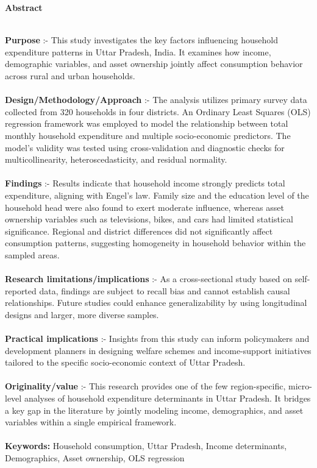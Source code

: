 

\begin{center}
\large \bf{Abstract}
\end{center}
\\
\textbf{Purpose} :- This study investigates the key factors influencing household expenditure patterns in Uttar Pradesh, India. It examines how income, demographic variables, and asset ownership jointly affect consumption behavior across rural and urban households.
\\
\\
\textbf{Design/Methodology/Approach} :- The analysis utilizes primary survey data collected from 320 households in four districts. An Ordinary Least Squares (OLS) regression framework was employed to model the relationship between total monthly household expenditure and multiple socio-economic predictors. The model’s validity was tested using cross-validation and diagnostic checks for multicollinearity, heteroscedasticity, and residual normality.
\\
\\
\textbf{Findings} :- Results indicate that household income strongly predicts total expenditure, aligning with Engel’s law. Family size and the education level of the household head were also found to exert moderate influence, whereas asset ownership variables such as televisions, bikes, and cars had limited statistical significance. Regional and district differences did not significantly affect consumption patterns, suggesting homogeneity in household behavior within the sampled areas.
\\
\\
\textbf{Research limitations/implications } :- As a cross-sectional study based on self-reported data, findings are subject to recall bias and cannot establish causal relationships. Future studies could enhance generalizability by using longitudinal designs and larger, more diverse samples.
\\
\\
\textbf{Practical implications} :- Insights from this study can inform policymakers and development planners in designing welfare schemes and income-support initiatives tailored to the specific socio-economic context of Uttar Pradesh.
\\
\\
\textbf{Originality/value} :- This research provides one of the few region-specific, micro-level analyses of household expenditure determinants in Uttar Pradesh. It bridges a key gap in the literature by jointly modeling income, demographics, and asset variables within a single empirical framework.
\\
\\
\textbf{Keywords:} Household consumption, Uttar Pradesh, Income determinants, Demographics, Asset ownership, OLS regression
